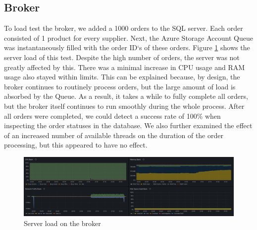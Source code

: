 \documentclass[10pt,a4paper,kul]{kulakarticle} %
\begin{document}
		\subsection{Broker}
			To load test the broker, we added a 1000 orders to the SQL server. Each order consisted of 1 product for every supplier. Next, the Azure Storage Account Queue was instantaneously filled with the order ID`s of these orders. Figure \ref{fig:broker_load} shows the server load of this test. Despite the high number of orders, the server was not greatly affected by this. There was a minimal increase in CPU usage and RAM usage also stayed within limits. This can be explained because, by design, the broker continues to routinely process orders, but the large amount of load is absorbed by the Queue. As a result, it takes a while to fully complete all orders, but the broker itself continues to run smoothly during the whole process. After all orders were completed, we could detect a success rate of 100\% when inspecting the order statuses in the database. We also further examined the effect of an increased number of available threads on the duration of the order processing, but this appeared to have no effect.
			\begin{figure}[h!]
				\centering
				\includegraphics[width=0.9\linewidth]{images/broker-load}
				\caption{Server load on the broker}
				\label{fig:broker_load}
			\end{figure}
		
\end{document}
